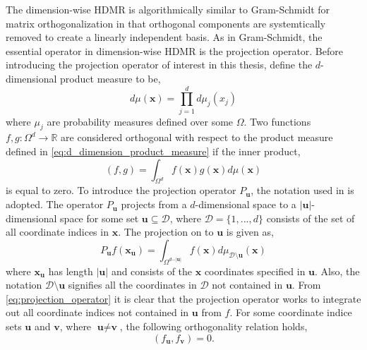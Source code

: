 The dimension-wise \ac{HDMR} is algorithmically similar to Gram-Schmidt for matrix orthogonalization in that orthogonal components are systemtically removed to create a linearly independent basis. As in Gram-Schmidt, the essential operator in dimension-wise \ac{HDMR} is the projection operator. Before introducing the projection operator of interest in this thesis, define the $d$-dimensional product measure to be,
\begin{equation} \label{eq:d_dimension_product_measure}
    d\mu\left(\textbf{x}\right) = \prod_{j=1}^{d}
                              d\mu_{j}\left(x_j\right) 
\end{equation}
where $\mu_j$ are probability measures defined over some $\Omega$. Two functions $f,g:\Omega^d \rightarrow \mathbb{R}$ are considered orthogonal with respect to the product measure defined in \ref{eq:d_dimension_product_measure} if the inner product,
\begin{equation} \label{eq:inner_product}
   \left(f,g\right)=\int_{\Omega^d} f(\textbf{x})g(\textbf{x})d\mu(\textbf{x})
\end{equation} 
is equal to zero. To introduce the projection operator $P_\textbf{u}$, the notation used in \cite{Holtz} is adopted. The operator $P_\textbf{u}$ projects from a $d$-dimensional space to a $\vert\textbf{u}\vert$-dimensional space for some set $\textbf{u}\subseteq \mathcal{D}$, where $\mathcal{D}=\lbrace 1,...,d\rbrace$ consists of the set of all coordinate indices in $\textbf{x}$. The projection on to $\textbf{u}$ is given as,
\begin{equation} \label{eq:projection_operator}
    P_\textbf{u}f\left(\textbf{x}_{\textbf{u}}\right) =
     \int_{\Omega^{d-\vert\textbf{u}\vert}} 
      f\left(\textbf{x}\right)d\mu_{\mathcal{D}\setminus\textbf{u}}
       \left(\textbf{x}\right)
\end{equation}
where $\textbf{x}_\textbf{u}$ has length $\vert\textbf{u}\vert$ and consists of the $\textbf{x}$ coordinates specified in $\textbf{u}$. Also, the notation $\mathcal{D}\setminus\textbf{u}$ signifies all the coordinates in $\mathcal{D}$ not contained in $\textbf{u}$. From \ref{eq:projection_operator} it is clear that the projection operator works to integrate out all coordinate indices not contained in $\textbf{u}$ from $f$. For some coordinate indice sets $\textbf{u}$ and $\textbf{v}$, where $\textbf{u}\neq\textbf{v}$, the following orthogonality relation holds,
\begin{equation} \label{eq:orthogonality_relation}
    \left(f_\textbf{u},f_\textbf{v}\right) = 0.
\end{equation}
